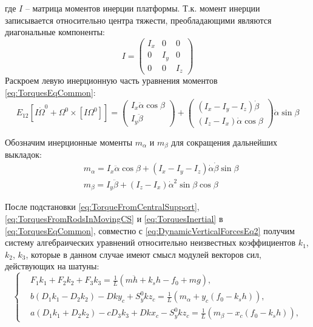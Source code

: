 где $I$ – матрица моментов инерции платформы. Т.к. момент инерции записывается относительно центра тяжести, преобладающими являются диагональные компоненты:
\begin{equation}
I = \begin{pmatrix}
I_x & 0 & 0 \\ 0 & I_y & 0 \\ 0 & 0 & I_z
\end{pmatrix}
\end{equation}
Раскроем левую инерционную часть уравнения моментов \ref{eq:TorquesEqCommon}:
\begin{equation}
\label{eq:TorquesEqLeftInertialPart}
E_{12}\left[I\dot{\Omega}^0 + \Omega^0 \times \left[I\Omega^0\right] \right] = \begin{pmatrix}I_x\ddot{\alpha}\cos{\beta} \\ I_y\ddot{\beta}\end{pmatrix} +
\begin{pmatrix}\left(I_x-I_y-I_z\right)\dot{\beta} \\ \left(I_z-I_x\right)\dot{\alpha}\cos{\beta}\end{pmatrix}\dot{\alpha}\sin{\beta}
\end{equation}

Обозначим инерционные моменты $m_{\alpha}$ и $m_\beta$ для сокращения дальнейших выкладок:
\begin{equation}
\label{eq:TorquesInertial}
\begin{aligned}
& m_{\alpha} = I_x\ddot{\alpha}\cos{\beta} + \left(I_x-I_y-I_z\right)\dot{\alpha}\dot{\beta}\sin{\beta} \\
& m_{\beta} = I_y\ddot{\beta} + \left(I_z-I_x\right)\dot{\alpha}^2\sin{\beta}\cos{\beta}
\end{aligned}
\end{equation}

После подстановки \ref{eq:TorqueFromCentralSupport}, \ref{eq:TorquesFromRodsInMovingCS} и \ref{eq:TorquesInertial} в \ref{eq:TorquesEqCommon}, совместно с \ref{eq:DynamicVerticalForcesEq2} получим систему алгебраических уравнений относительно неизвестных коэффициентов $k_1$, $k_2$, $k_3$, которые в данном случае имеют смысл модулей векторов сил, действующих на шатуны:
\begin{equation}
\label{eq:KoefsLinearSystem1}
\left\{
\begin{aligned}
& F_1k_1 + F_2k_2 + F_3k_3 = \frac{1}{L}\left(m\ddot{h}+k_sh-f_0+mg\right), \\
& b\left(D_1k_1-D_2k_2\right)-Dky_c + S_y^0kz_c = \frac{1}{L}\left(m_{\alpha} + y_c\left(f_0 - k_sh\right)\right), \\
& a\left(D_1k_1+D_2k_2\right)-cD_3k_3+Dkx_c-S_y^0kz_c = \frac{1}{L}\left(m_{\beta} - x_c\left(f_0 - k_sh\right)\right),
\end{aligned}
\right.
\end{equation}

